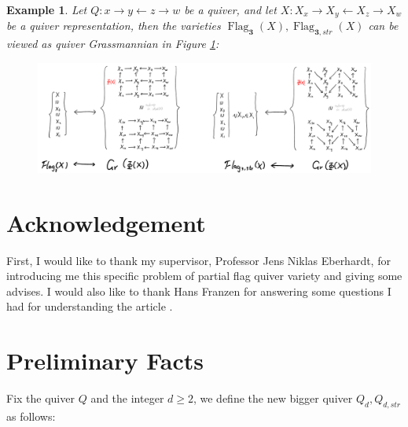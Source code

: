\documentclass[reqno,11pt]{amsart}
\numberwithin{equation}{section}
\theoremstyle{plain}
\newtheorem{eg}[theorem]{Example}
\theoremstyle{plain}
\numberwithin{equation}{section}
\theoremstyle{remark}
\newcommand{\Flag}[1]{\operatorname{Flag}_{\mathbf{#1}}}
\newcommand{\Flagstr}[1]{\operatorname{Flag}_{\mathbf{#1},str}}
\begin{document}
\begin{eg}
Let $Q\colon x \longrightarrow y \longleftarrow z \longrightarrow w$ be a quiver, and let $X\colon X_x \longrightarrow X_y \longleftarrow X_z \longrightarrow X_w$ be a quiver representation, then the varieties $\Flag{3}(X),\Flagstr{3}(X)$ can be viewed as quiver Grassmannian in Figure \ref{fig:flagasgr}:
\begin{center}
	\begin{figure}[ht]
		\vspace{0cm}
		\centering
		\includegraphics[width=15cm]{figures/flagasgr.png}
		\caption{}
		\label{fig:flagasgr}
	\end{figure}
\end{center}


\end{eg}
\section*{Acknowledgement}
First, I would like to thank my supervisor, Professor Jens Niklas Eberhardt, for introducing me this specific problem of partial flag quiver variety and giving some advises. I would also like to thank Hans Franzen for answering some questions I had for understanding the article \cite{irelli2019cell}.
\section{Preliminary Facts}\label{sec:flag=gr}
Fix the quiver $Q$ and the integer $d \geqslant 2$, we define the new bigger quiver $Q_{d},Q_{d,str}$ as follows:
\end{document}
